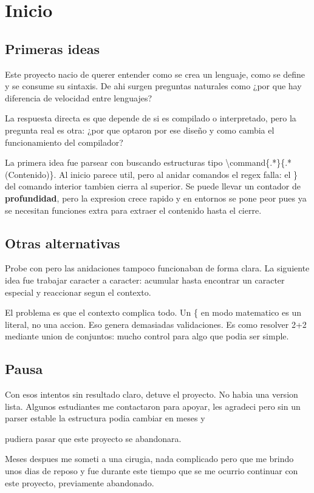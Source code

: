 \chapter{ Inicio }

\section{ Primeras ideas }

Este proyecto nacio de querer entender como se crea un lenguaje, como se define
y se consume su sintaxis. De ahi surgen preguntas naturales como ¿por que
hay diferencia de velocidad entre lenguajes?

La respuesta directa es que depende de si es compilado o interpretado, pero
la pregunta real es otra: ¿por que optaron por ese diseño y como cambia el
funcionamiento del compilador?

La primera idea fue parsear con  buscando estructuras tipo \backslash command\{.*\}\{.*(Contenido)\}.
Al inicio parece util, pero al anidar comandos el regex falla: el \} del comando
interior tambien cierra al superior. Se puede llevar un contador de \textbf{profundidad},
pero la expresion crece rapido y en entornos se pone peor pues ya se necesitan
funciones extra para extraer el contenido hasta el cierre.

\section{ Otras alternativas }

Probe con  pero las 
anidaciones tampoco funcionaban de forma clara.
La siguiente idea fue trabajar caracter a caracter: acumular hasta encontrar
un caracter especial y reaccionar segun el contexto.

El problema es que el contexto complica todo. Un \{ en modo matematico es un
literal, no una accion. Eso genera demasiadas validaciones. Es como resolver
2+2 mediante union de conjuntos: mucho control para algo que podia ser simple.

\section{ Pausa }

Con esos intentos sin resultado claro, detuve el proyecto. No habia una version
 lista.
Algunos estudiantes me contactaron para apoyar, les agradeci pero sin un
parser estable la estructura podia cambiar en meses y

\alert{ pudiera pasar que este proyecto se abandonara. }

Meses despues me someti a una cirugia, nada complicado pero que me brindo unos
dias de reposo y fue durante este tiempo que se me ocurrio continuar con este
proyecto, previamente abandonado.

